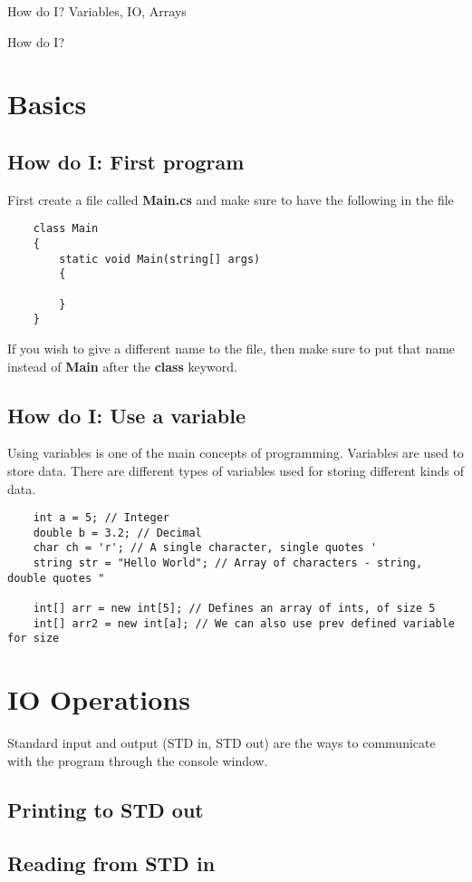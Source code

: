 \documentclass{exam}
\newcommand{\bfemph}[1]{\textbf{#1}}
\renewcommand{\emph}[1]{\bfemph{#1}}
\begin{document}
\normalsize
\textsf{How do I?}
\hfill
Variables, IO, Arrays

\noindent\makebox[\linewidth]{\rule{\paperwidth}{0.4pt}}

\bigskip
\huge
\noindent
\textsf{How do I?}

\large

\tableofcontents

\bigskip


\section{Basics}
\subsection{How do I: First program}
First create a file called \emph{Main.cs} and make sure to have the following in the file
\begin{verbatim}
    class Main
    {
        static void Main(string[] args) 
        {

        }
    }
\end{verbatim}
If you wish to give a different name to the file, then make sure to put that name instead of \emph{Main}
after the \emph{class} keyword.
\bigskip

\subsection{How do I: Use a variable}
Using variables is one of the main concepts of programming. Variables are used to store
data. There are different types of variables used for storing different kinds of data.

\begin{verbatim}
    int a = 5; // Integer
    double b = 3.2; // Decimal
    char ch = 'r'; // A single character, single quotes '
    string str = "Hello World"; // Array of characters - string, double quotes "

    int[] arr = new int[5]; // Defines an array of ints, of size 5
    int[] arr2 = new int[a]; // We can also use prev defined variable for size 
\end{verbatim}

\section{IO Operations}
Standard input and output (STD in, STD out) are the ways to communicate with the program
through the console window.

\subsection{Printing to STD out}

\subsection{Reading from STD in}

\vspace{5mm}

\large
\end{document}
